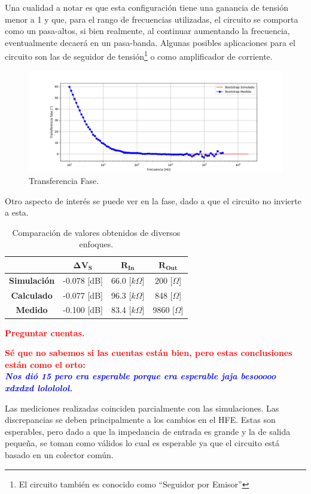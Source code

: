 Una cualidad a notar es que esta configuración tiene una ganancia de tensión menor a 1 y que, para el rango de frecuencias utilizadas, el circuito se comporta como un pasa-altos, si bien realmente, al continuar aumentando la frecuencia, eventualmente decaerá en un pasa-banda. Algunas posibles aplicaciones para el circuito son las de seguidor de tensión\footnote{El circuito también es conocido como ``Seguidor por Emisor''} o como amplificador de corriente.
\begin{figure} [H]
	\centering
	\includegraphics[width=\textwidth]{imagenes/avsp.png}
	\caption{Transferencia Fase.}
	\label{fig:transph}
\end{figure}

Otro aspecto de interés se puede ver en la fase, dado a que el circuito no invierte a esta.
\begin{table}[H]
\centering
\begin{tabular}{cccc}
\hline                   & $\mathbf{\Delta V_S}$ & $\mathbf{R_{In}}$ & $\mathbf{R_{Out}}$ \\
\hline
\textbf{Simulación} & -0.078 [dB]          & 66.0 [$k\Omega$]    & 200 [$\Omega$]     \\
\textbf{Calculado}  & -0.077 [dB]            & 96.3 [$k\Omega$]   & 848 [$\Omega$]     \\
\textbf{Medido}     & -0.100 [dB]             & 83.4 [$k\Omega$]  & 9860 [$\Omega$]   	\\
\hline
\end{tabular}
\caption{Comparación de valores obtenidos de diversos enfoques.}
\label{tabla:comparacion}
\end{table}

\begin{center}
	\textcolor{red}{\textbf{Preguntar cuentas.}}
\end{center}

\begin{center}
	\textcolor{red}{\textbf{Sé que no sabemos si las cuentas están bien, pero estas conclusiones están como el orto:}}\\
	\textcolor{blue}{\textbf{\textit{Nos dió 15 pero era esperable porque era esperable jaja besooooo xdxdxd lolololol.}}}
\end{center}

Las mediciones realizadas coinciden parcialmente con las simulaciones. Las discrepancias se deben principalmente a los cambios en el HFE. Estas son esperables, pero dado a que la impedancia de entrada es grande y la de salida pequeña, se toman como válidos lo cual es esperable ya que el circuito está basado en un colector común.


